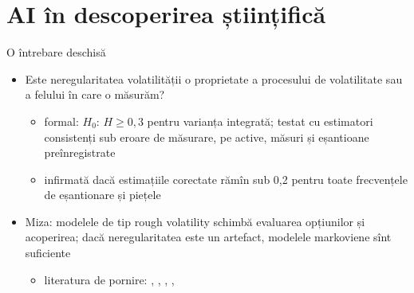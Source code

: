 \section{AI în descoperirea științifică}

\begin{frame}{O întrebare deschisă}
\itemsize{\small}
\begin{itemize}
    \item Este neregularitatea volatilității o proprietate a procesului de volatilitate sau a felului în care o măsurăm?
    \begin{itemize}
        \item formal: $H_0$: $H \ge 0{,}3$ pentru varianța integrată; testat cu estimatori consistenți sub eroare de măsurare, pe active, măsuri și eșantioane preînregistrate
        \item infirmată dacă estimațiile corectate rămîn sub 0,2 pentru toate frecvențele de eșantionare și piețele
    \end{itemize}
    \item Miza: modelele de tip rough volatility schimbă evaluarea opțiunilor și acoperirea; dacă neregularitatea este un artefact, modelele markoviene sînt suficiente
    \begin{itemize}
        \item literatura de pornire: , , , , 
    \end{itemize}
\end{itemize}
\end{frame}

